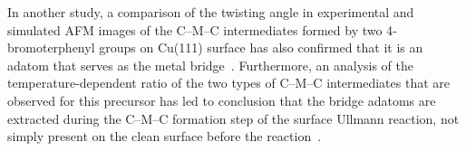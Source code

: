 \documentclass[%
 reprint,
 amsmath,amssymb,
 aps,
prb,
floatfix,
]{revtex4-2}
\newcommand{\comm}{\color{ForestGreen}} %
\begin{document}
{%

In another study, a comparison of the twisting angle in experimental and simulated AFM images of the C--M--C intermediates formed by two 4‐bromoterphenyl groups on Cu(111) surface 
has also confirmed that it is an adatom that serves as the metal bridge~\cite{acsnano2019}. Furthermore, an analysis of the temperature-dependent ratio of the two types of C--M--C intermediates that are observed for this precursor has led to conclusion that the bridge adatoms are extracted during the C--M--C formation step of the surface Ullmann reaction, not simply present on the clean surface before the reaction~\cite{acsnano2019}. 

}

\end{document}
